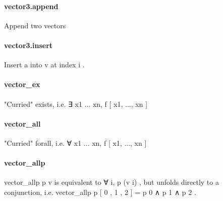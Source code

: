 \documentclass{article}
\begin{document}
\paragraph{vector3.append}
\par
Append two vectors
\paragraph{vector3.insert}
\par
Insert 
\colorbox[RGB]{253,246,227}{{{{\color[RGB]{101, 123, 131} a }}}} into 
\colorbox[RGB]{253,246,227}{{{{\color[RGB]{101, 123, 131} v }}}} at index 
\colorbox[RGB]{253,246,227}{{{{\color[RGB]{101, 123, 131} i }}}}.
\paragraph{vector\_ex}
\par
"Curried" exists, i.e. ∃ x1 ... xn, f 
{[}
x1, ..., xn
{]}
\paragraph{vector\_all}
\par
"Curried" forall, i.e. ∀ x1 ... xn, f 
{[}
x1, ..., xn
{]}
\paragraph{vector\_allp}
\par
\colorbox[RGB]{253,246,227}{{{{\color[RGB]{101, 123, 131} vector\_allp p v }}}} is equivalent to 
\colorbox[RGB]{253,246,227}{{{{\color[RGB]{101, 123, 131} ∀ i, p (v i) }}}}, but unfolds directly to a conjunction,
i.e. 
\colorbox[RGB]{253,246,227}{{{{\color[RGB]{101, 123, 131} vector\_allp p {[} }}}{{{\color[RGB]{108, 113, 196} 0 }}}{{{\color[RGB]{101, 123, 131} ,  }}}{{{\color[RGB]{108, 113, 196} 1 }}}{{{\color[RGB]{101, 123, 131} ,  }}}{{{\color[RGB]{108, 113, 196} 2 }}}{{{\color[RGB]{101, 123, 131} {]}  }}}{{{\color[RGB]{181, 137, 0} = }}}{{{\color[RGB]{101, 123, 131}  p  }}}{{{\color[RGB]{108, 113, 196} 0 }}}{{{\color[RGB]{101, 123, 131}   }}}{{{\color[RGB]{181, 137, 0} ∧ }}}{{{\color[RGB]{101, 123, 131}  p  }}}{{{\color[RGB]{108, 113, 196} 1 }}}{{{\color[RGB]{101, 123, 131}   }}}{{{\color[RGB]{181, 137, 0} ∧ }}}{{{\color[RGB]{101, 123, 131}  p  }}}{{{\color[RGB]{108, 113, 196} 2 }}}}.
\end{document}
